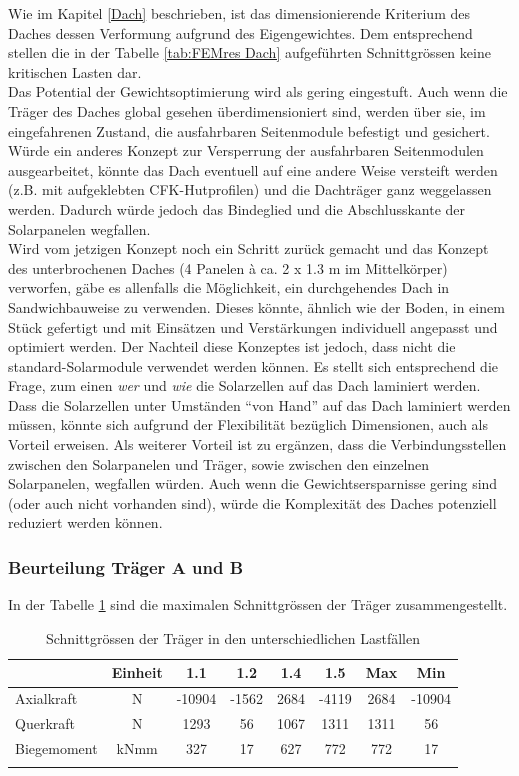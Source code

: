 Wie im Kapitel \ref{Dach} beschrieben, ist das dimensionierende Kriterium des Daches dessen Verformung aufgrund des Eigengewichtes. Dem entsprechend stellen die in der Tabelle \ref{tab:FEMres Dach} aufgeführten Schnittgrössen keine kritischen Lasten dar.\\
Das Potential der Gewichtsoptimierung wird als gering eingestuft. Auch wenn die Träger des Daches global gesehen überdimensioniert sind, werden über sie, im eingefahrenen Zustand, die ausfahrbaren Seitenmodule befestigt und gesichert. Würde ein anderes Konzept zur Versperrung der ausfahrbaren Seitenmodulen ausgearbeitet, könnte das Dach eventuell auf eine andere Weise versteift werden (z.B. mit aufgeklebten CFK-Hutprofilen) und die Dachträger ganz weggelassen werden. Dadurch würde jedoch das Bindeglied und die Abschlusskante der Solarpanelen wegfallen.\\
Wird vom jetzigen Konzept noch ein Schritt zurück gemacht und das Konzept des unterbrochenen Daches (4 Panelen à ca. 2 x 1.3 m im Mittelkörper) verworfen, gäbe es allenfalls die Möglichkeit, ein durchgehendes Dach in Sandwichbauweise zu verwenden. Dieses könnte, ähnlich wie der Boden, in einem Stück gefertigt und mit Einsätzen und Verstärkungen individuell angepasst und optimiert werden. Der Nachteil diese Konzeptes ist jedoch, dass nicht die standard-Solarmodule verwendet werden können. Es stellt sich entsprechend die Frage, zum einen \emph{wer} und \emph{wie} die Solarzellen auf das Dach laminiert werden. Dass die Solarzellen unter Umständen ``von Hand'' auf das Dach laminiert werden müssen, könnte sich aufgrund der Flexibilität bezüglich Dimensionen, auch als Vorteil erweisen. Als weiterer Vorteil ist zu ergänzen, dass die Verbindungsstellen zwischen den Solarpanelen und Träger, sowie zwischen den einzelnen Solarpanelen, wegfallen würden. Auch wenn die Gewichtsersparnisse gering sind (oder auch nicht vorhanden sind), würde die Komplexität des Daches potenziell reduziert werden können.



\subsubsection{Beurteilung Träger A und B}
In der Tabelle \ref{tab:FEMres Träger} sind die maximalen Schnittgrössen der Träger zusammengestellt.
\begin{table}[H]
\centering
\begin{tabular}{lccccccc}
\thickhline
&	Einheit	&	1.1	&	1.2	&	1.4	&	1.5	&	Max	&	Min	\\	\hline
Axialkraft	&	N	&	-10904	&	-1562	&	2684	&	-4119	&	2684	&	-10904	\\
Querkraft	&	N	&	1293	&	56	&	1067	&	1311	&	1311	&	56	\\
Biegemoment	&	kNmm	&	327	&	17	&	627	&	772	&	772	&	17	\\	\thickhline
\end{tabular}
\caption{Schnittgrössen der Träger in den unterschiedlichen Lastfällen}
\label{tab:FEMres Träger}
\end{table}

